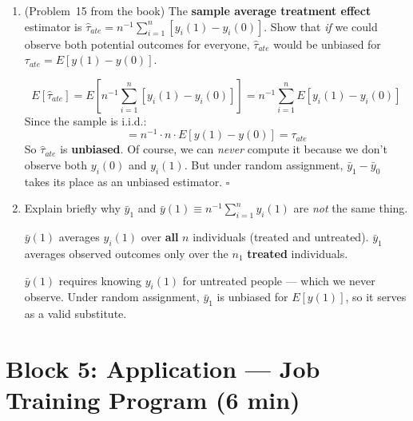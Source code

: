 \documentclass[11pt,a4paper]{article}
\begin{document}
\begin{enumerate}[label=(\alph*)]
\begin{solution}
\smallskip
The entire argument is: randomization $\Rightarrow$ independence $\Rightarrow$ conditioning does nothing $\Rightarrow$ selection bias $= 0$.

This is why \textbf{RCTs} are the gold standard. Under random assignment, OLS gives $\hat{\beta}_1 = \bar{y}_1 - \bar{y}_0$, which is unbiased for the ATE (equation~[2.82]).
\end{solution}

\item (Problem~15 from the book) The \textbf{sample average treatment effect} estimator is $\hat{\tau}_{ate} = n^{-1}\sum_{i=1}^{n}[y_i(1) - y_i(0)]$. Show that \emph{if} we could observe both potential outcomes for everyone, $\hat{\tau}_{ate}$ would be unbiased for $\tau_{ate} = E[y(1) - y(0)]$.

\begin{solution}
\[
  E[\hat{\tau}_{ate}]
  = E\!\left[n^{-1}\sum_{i=1}^{n}[y_i(1) - y_i(0)]\right]
  = n^{-1}\sum_{i=1}^{n} E[y_i(1) - y_i(0)]
\]
Since the sample is i.i.d.:
\[
  = n^{-1} \cdot n \cdot E[y(1) - y(0)] = \tau_{ate}
\]
So $\hat{\tau}_{ate}$ is \textbf{unbiased}. Of course, we can \emph{never} compute it because we don't observe both $y_i(0)$ and $y_i(1)$. But under random assignment, $\bar{y}_1 - \bar{y}_0$ takes its place as an unbiased estimator. \hfill$\square$
\end{solution}

\item Explain briefly why $\bar{y}_1$ and $\bar{y}(1) \equiv n^{-1}\sum_{i=1}^{n} y_i(1)$ are \emph{not} the same thing.

\begin{solution}
$\bar{y}(1)$ averages $y_i(1)$ over \textbf{all} $n$ individuals (treated and untreated). $\bar{y}_1$ averages observed outcomes only over the $n_1$ \textbf{treated} individuals.

$\bar{y}(1)$ requires knowing $y_i(1)$ for untreated people --- which we never observe. Under random assignment, $\bar{y}_1$ is unbiased for $E[y(1)]$, so it serves as a valid substitute.
\end{solution}
\end{enumerate}

\section{Block 5: Application --- Job Training Program \textnormal{(6 min)}}
\end{document}
